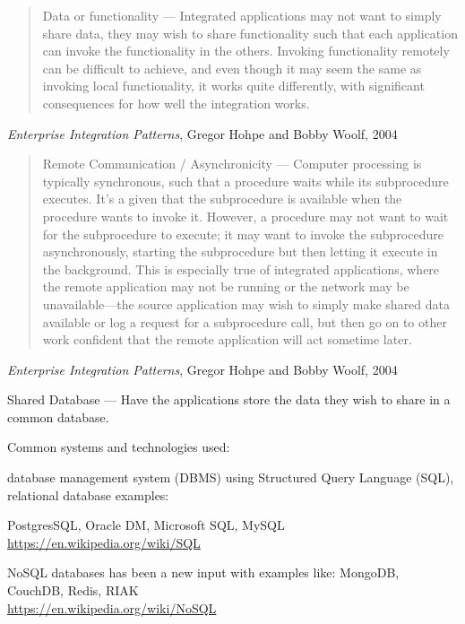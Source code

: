 \documentclass[Screen16to9,17pt]{foils}
\begin{document}

\begin{quote}
Data or functionality — Integrated applications may not want to simply share data, they may wish to share functionality such that each application can invoke the functionality in the others. Invoking functionality remotely can be difficult to achieve, and even though it may seem the same as invoking local functionality, it works quite differently, with significant consequences for how well the integration works.
\end{quote}
\emph{Enterprise Integration Patterns}, Gregor Hohpe and Bobby Woolf, 2004


\begin{quote}
Remote Communication / Asynchronicity — Computer processing is typically synchronous, such that a procedure waits while its subprocedure executes. It’s a given that the subprocedure is available when the procedure wants to invoke it. However, a procedure may not want to wait for the subprocedure to execute; it may want to invoke the subprocedure asynchronously, starting the subprocedure but then letting it execute in the background. This is especially true of integrated applications, where the remote application may not be running or the network may be unavailable—the source application may wish to simply make shared data available or log a request for a subprocedure call, but then go on to other work confident that the remote application will act sometime later.
\end{quote}
\emph{Enterprise Integration Patterns}, Gregor Hohpe and Bobby Woolf, 2004




Shared Database — Have the applications store the data they wish to share in a common database.

Common systems and technologies used:
\begin{list2}
\item database management system (DBMS) using Structured Query Language (SQL), relational database examples:\\
\item PostgresSQL, Oracle DM, Microsoft SQL, MySQL
\url{https://en.wikipedia.org/wiki/SQL}
\item NoSQL databases has been a new input with examples like:
MongoDB, CouchDB, Redis, RIAK\\
\url{https://en.wikipedia.org/wiki/NoSQL}
\end{list2}
\end{document}
